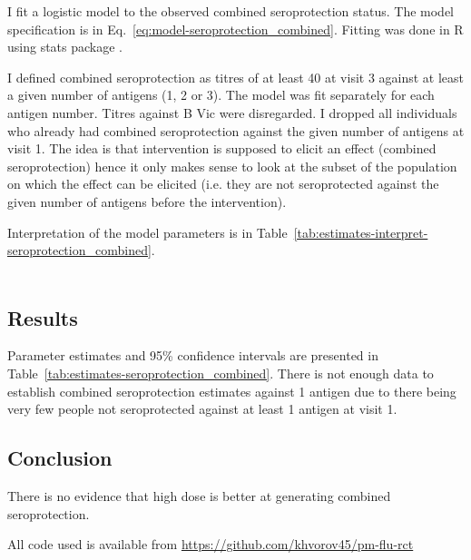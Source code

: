 \documentclass[11pt]{article}
\begin{document}
I fit a logistic model to the observed combined seroprotection status.
The model specification is in Eq.~\ref{eq:model-seroprotection_combined}.
Fitting was done in R using stats package \cite{R}.

I defined combined seroprotection as titres of at least 40 at visit 3 against
at least a given number of antigens (1, 2 or 3). The model was fit separately
for each antigen number.
Titres against B Vic were disregarded.
I dropped all individuals who already had combined seroprotection against
the given number of antigens at visit 1.
The idea is that intervention is supposed to elicit an effect
(combined seroprotection)
hence it only makes sense to look at the subset of the population on which
the effect can be elicited
(i.e. they are not seroprotected against the given number of antigens
before the intervention).

Interpretation of the model parameters is in
Table~\ref{tab:estimates-interpret-seroprotection_combined}.

\begin{equation}
  \begin{gathered}
    \label{eq:model-seroprotection_combined}
    
  \end{gathered}
\end{equation}





\subsection{Results}

Parameter estimates and 95\% confidence intervals
are presented in Table~\ref{tab:estimates-seroprotection_combined}.
There is not enough data to establish combined seroprotection
estimates against 1 antigen due to there being very few people
not seroprotected against at least 1 antigen at visit 1.



\subsection{Conclusion}

There is no evidence that high dose is better at generating combined
seroprotection.



All code used is available from \url{https://github.com/khvorov45/pm-flu-rct}
\end{document}
